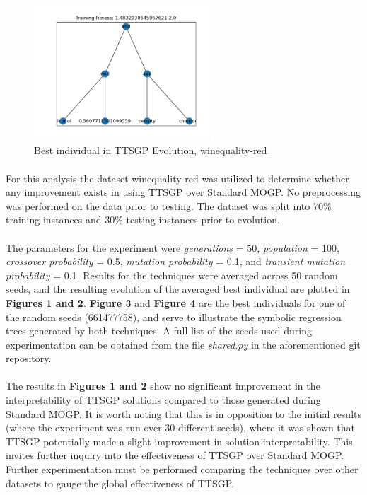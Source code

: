 \documentclass[a4paper]{article}
\begin{document}
\begin{figure}[H]
	\caption{Best individual in TTSGP Evolution, winequality-red}
	\centering
	\includegraphics[width=0.6\textwidth]{redwine-ttgp-ex}
\end{figure}
\paragraph{}For this analysis the dataset winequality-red was utilized to determine whether any improvement exists in using TTSGP over Standard MOGP. No preprocessing was performed on the data prior to testing. The dataset was split into 70\% training instances and 30\% testing instances prior to evolution.
\paragraph{}The parameters for the experiment were \textit{generations} = 50, \textit{population} = 100, \textit{crossover probability} = 0.5, \textit{mutation probability} = 0.1, and \textit{transient mutation probability} = 0.1. Results for the techniques were averaged across 50 random seeds, and the resulting evolution of the averaged best individual are plotted in \textbf{Figures 1 and 2}. \textbf{Figure 3} and \textbf{Figure 4} are the best individuals for one of the random seeds (661477758), and serve to illustrate the symbolic regression trees generated by both techniques. A full list of the seeds used during experimentation can be obtained from the file \textit{shared.py} in the aforementioned git repository. 
\paragraph{} The results in \textbf{Figures 1 and 2} show no significant improvement in the interpretability of TTSGP solutions compared to those generated during Standard MOGP. It is worth noting that this is in opposition to the initial results (where the experiment was run over 30 different seeds), where it was shown that TTSGP potentially made a slight improvement in solution interpretability. This invites further inquiry into the effectiveness of TTSGP over Standard MOGP. Further experimentation must be performed comparing the techniques over other datasets to gauge the global effectiveness of TTSGP.
\end{document}
